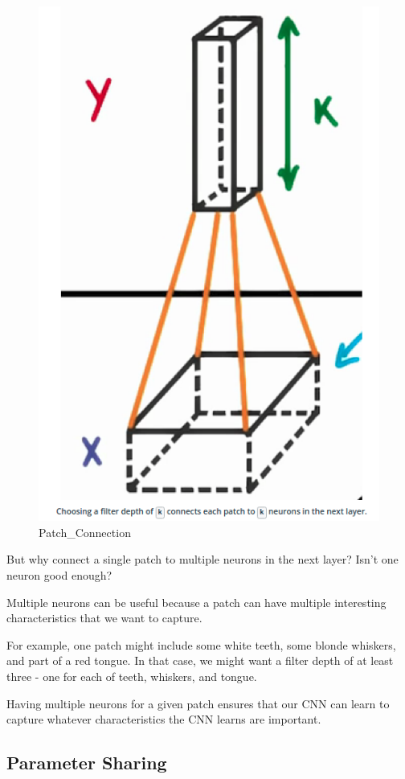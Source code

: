 \documentclass[11pt, a4paper]{article}
\begin{document}
\begin{figure}[htb!]
	\centering
	\includegraphics[width=0.8\linewidth]{patch_connection_2}
	\caption{Patch\_Connection}
	\label{fig:patch_connection_2}
\end{figure}


But why connect a single patch to multiple neurons in the next layer? Isn’t one neuron good enough?

Multiple neurons can be useful because a patch can have multiple interesting characteristics that we want to capture.

For example, one patch might include some white teeth, some blonde whiskers, and part of a red tongue. In that case, we might want a filter depth of at least three - one for each of teeth, whiskers, and tongue.

Having multiple neurons for a given patch ensures that our CNN can learn to capture whatever characteristics the CNN learns are important.


\subsection{Parameter Sharing}%
\label{sub:parameter_sharing}
\end{document}
